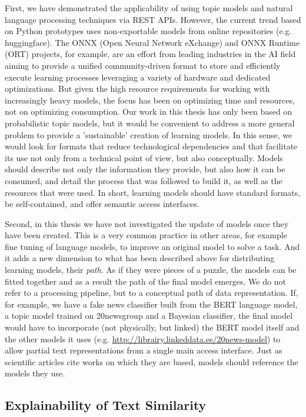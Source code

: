 First, we have demonstrated the applicability of using topic models and natural language processing techniques via REST APIs. However, the current trend based on Python prototypes uses non-exportable models from online repositories (e.g. huggingface). The ONNX (Open Neural Network eXchange) and ONNX Runtime (ORT) projects, for example, are an effort from leading industries in the AI field aiming to provide a unified community-driven format to store and efficiently execute learning processes leveraging a variety of hardware and dedicated optimizations. But given the high resource requirements for working with increasingly heavy models, the focus has been on optimizing time and resources, not on optimizing consumption. Our work in this thesis has only been based on probabilistic topic models, but it would be convenient to address a more general problem to provide a 'sustainable' creation of learning models. In this sense, we would look for formats that reduce technological dependencies and that facilitate its use not only from a technical point of view, but also conceptually. Models should describe not only the information they provide, but also how it can be consumed, and detail the process that was followed to build it, as well as the resources that were used. In short, learning models should have standard formats, be self-contained, and offer semantic access interfaces.

Second, in this thesis we have not investigated the update of models once they have been created. This is a very common practice in other areas, for example fine tuning of language models, to improve an original model to solve a task. And it adds a new dimension to what has been described above for distributing learning models, their \textit{path}. As if they were pieces of a puzzle, the models can be fitted together and as a result the path of the final model emerges. We do not refer to a processing pipeline, but to a conceptual path of data representation. If, for example, we have a fake news classifier built from the BERT language model, a topic model trained on 20newsgroup and a Bayesian classifier, the final model would have to incorporate (not physically, but linked) the BERT model itself and the other models it uses (e.g. \url{http://librairy.linkeddata.es/20news-model}) to allow partial text representations from a single main access interface. Just as scientific articles cite works on which they are based, models should reference the models they use. 


\subsection{Explainability of Text Similarity}

